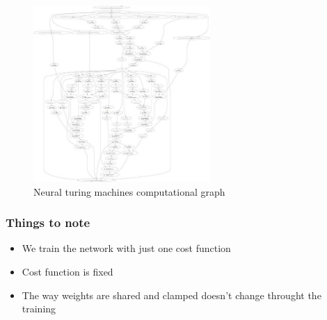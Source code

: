 \documentclass{beamer}
\begin{document}
\begin{frame}
	\begin{figure}[h!]
	\centering
	\includegraphics[width=0.6\textwidth]{ntm_comp_graph.jpg}
	\caption{Neural turing machines computational graph}
	\label{fig:ntm_comp_graph}
	\end{figure}

\end{frame}
\begin{frame}
	\frametitle{Things to note}
	\begin{itemize}
		\item We train the network with just one cost function
		\item Cost function is fixed
		\item The way weights are shared and clamped doesn't change throught the training

	\end{itemize}
\end{frame}
\end{document}

